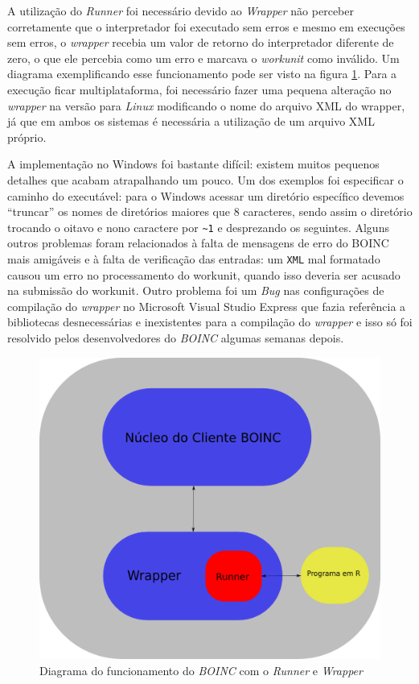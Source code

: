 A utilização do \emph{Runner} foi necessário devido ao \emph{Wrapper} não perceber corretamente
que o interpretador foi executado sem erros e mesmo em execuções sem erros, o \emph{wrapper} 
recebia um valor de retorno do interpretador diferente de zero, o que ele percebia como um erro
e marcava o \emph{workunit} como inválido. Um diagrama exemplificando esse funcionamento pode ser visto 
na figura \ref{diagrama-boinc-wrapper-windows}. Para a execução ficar multiplataforma, foi necessário 
fazer uma pequena alteração no \emph{wrapper} na versão para \emph{Linux} modificando o nome do
arquivo XML do wrapper, já que em ambos os sistemas é necessária a utilização de um arquivo XML próprio.


A implementação no Windows foi bastante difícil: existem muitos pequenos detalhes que acabam
atrapalhando um pouco. Um dos exemplos foi especificar o caminho do executável: para o Windows acessar
um diretório específico devemos ``truncar'' os nomes de diretórios maiores que $8$ caracteres, sendo 
assim o diretório trocando o oitavo e nono caractere por \verb#~1# e desprezando os seguintes. 
Alguns outros problemas foram relacionados à falta de mensagens de erro do BOINC mais amigáveis e
à falta de verificação das entradas: um \verb#XML# mal formatado causou um erro  no processamento
do workunit, quando isso deveria ser acusado na submissão do workunit. Outro problema foi um \emph{Bug}
nas configurações de compilação do \emph{wrapper} no Microsoft Visual Studio Express %
que fazia referência a bibliotecas desnecessárias e inexistentes para a compilação do \emph{wrapper}
e isso só foi resolvido pelos desenvolvedores do \emph{BOINC} algumas semanas depois. 


\begin{figure}[!h]
  \centering
  \includegraphics[scale=0.3]{boinc-diagram-runner.png}
  \caption{Diagrama do funcionamento do \emph{BOINC} com o \emph{Runner} e \emph{Wrapper}}
  \label{diagrama-boinc-wrapper-windows}
\end{figure}
 

